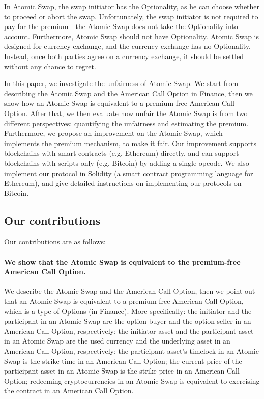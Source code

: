 In Atomic Swap, the swap initiator has the Optionality, as he can choose whether to proceed or abort the swap.
Unfortunately, the swap initiator is not required to pay for the premium - the Atomic Swap does not take the Optionality into account.
Furthermore, Atomic Swap should not have Optionality.
Atomic Swap is designed for currency exchange, and the currency exchange has no Optionality.
Instead, once both parties agree on a currency exchange, it should be settled without any chance to regret.

In this paper, we investigate the unfairness of Atomic Swap.
We start from describing the Atomic Swap and the American Call Option in Finance,
then we show how an Atomic Swap is equivalent to a premium-free American Call Option.
After that, we then evaluate how unfair the Atomic Swap is from two different perspectives:
quantifying the unfairness and estimating the premium.
Furthermore, we propose an improvement on the Atomic Swap, which implements the premium mechanism, to make it fair.
Our improvement supports blockchains with smart contracts (e.g. Ethereum) directly, and can support blockchains with scripts only (e.g. Bitcoin) by adding a single opcode.
We also implement our protocol in Solidity (a smart contract programming language for Ethereum), and give detailed instructions on implementing our protocols on Bitcoin.

\subsection{Our contributions}

Our contributions are as follows:

\paragraph{We show that the Atomic Swap is equivalent to the premium-free American Call Option.}
We describe the Atomic Swap and the American Call Option,
then we point out that an Atomic Swap is equivalent to a premium-free American Call Option, which is a type of Options (in Finance).
More specifically:
the initiator and the participant in an Atomic Swap are the option buyer and the option seller in an American Call Option, respectively;
the initiator asset and the participant asset in an Atomic Swap are the used currency and the underlying asset in an American Call Option, respectively;
the participant asset's timelock in an Atomic Swap is the strike time in an American Call Option;
the current price of the participant asset in an Atomic Swap is the strike price in an American Call Option;
redeeming cryptocurrencies in an Atomic Swap is equivalent to exercising the contract in an American Call Option.

